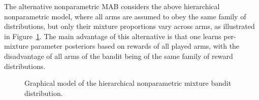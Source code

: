 The alternative nonparametric MAB considers the above hierarchical nonparametric model, where all arms are assumed to obey the same family of distributions, but only their mixture proportions vary across arms, as illustrated in Figure~\ref{afig:pgm_nonparametric_bandit_hierarchical}.
The main advantage of this alternative is that one learns per-mixture parameter posteriors based on rewards of all played arms, with the disadvantage of all arms of the bandit being of the same family of reward distributions.

\begin{figure}[!h]
\centering
\begin{center}
	
\end{center}
\vspace*{-2ex}
\caption{Graphical model of the hierarchical nonparametric mixture bandit distribution.}
\label{afig:pgm_nonparametric_bandit_hierarchical}
\vspace*{-2ex}
\end{figure}